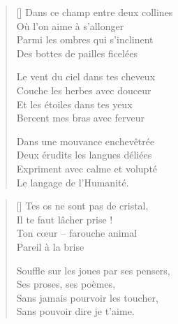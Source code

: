\newpage

\settowidth{\versewidth}{Une brindille qui tourne et chancelle}
\begin{verse}[\versewidth]
Dans ce champ entre deux collines \\
Où l'on aime à s'allonger \\
Parmi les ombres qui s'inclinent \\
Des bottes de pailles ficelées

Le vent du ciel dans tes cheveux \\
Couche les herbes avec douceur \\
Et les étoiles dans tes yeux \\
Bercent mes bras avec ferveur

Dans une mouvance enchevêtrée \\
Deux érudits les langues déliées \\
Expriment avec calme et volupté \\
Le langage de l'Humanité.
\end{verse}


\settowidth{\versewidth}{Souffle sur les joues par ses pensers,}
\begin{verse}[\versewidth]
Tes os ne sont pas de cristal, \\
Il te faut lâcher prise ! \\
Ton cœur -- farouche animal \\
Pareil à la brise

Souffle sur les joues par ses pensers, \\
Ses proses, ses poèmes, \\
Sans jamais pourvoir les toucher, \\
Sans pouvoir dire je t'aime.
\end{verse}